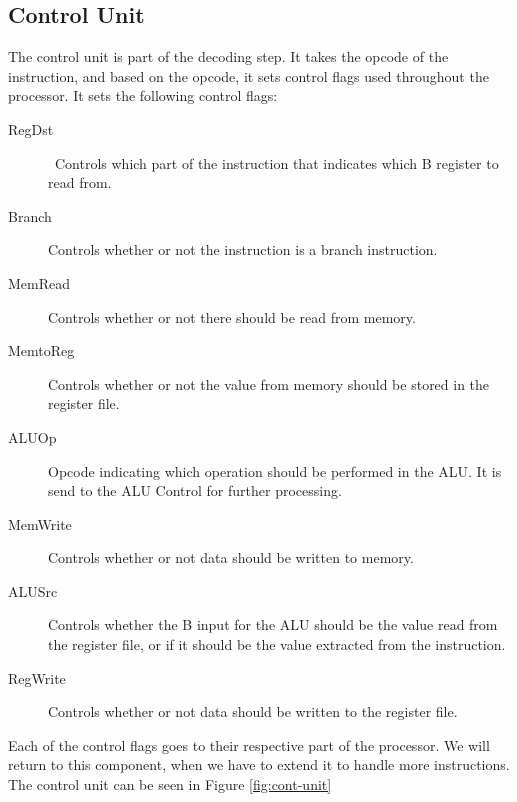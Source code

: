 \subsection{Control Unit}
\label{sec:control-unit}
The control unit is part of the decoding step. It takes the opcode of the
instruction, and based on the opcode, it sets control flags used throughout the
processor. It sets the following control flags:
\begin{description}
    \item[RegDst] Controls which part of the instruction that indicates which
        B register to read from.

    \item[Branch] Controls whether or not the instruction is a branch
        instruction.

    \item[MemRead] Controls whether or not there should be read from memory.

    \item[MemtoReg] Controls whether or not the value from memory should be
        stored in the register file.

    \item[ALUOp] Opcode indicating which operation should be performed in
        the ALU. It is send to the ALU Control for further processing.

    \item[MemWrite] Controls whether or not data should be written to memory.

    \item[ALUSrc] Controls whether the B input for the ALU should be the
        value read from the register file, or if it should be the value
        extracted from the instruction.

    \item[RegWrite] Controls whether or not data should be written to the
        register file.
\end{description}
Each of the control flags goes to their respective part of the processor.
We will return to this component, when we have to extend it to handle more
instructions. The control unit can be seen in Figure \ref{fig:cont-unit}
